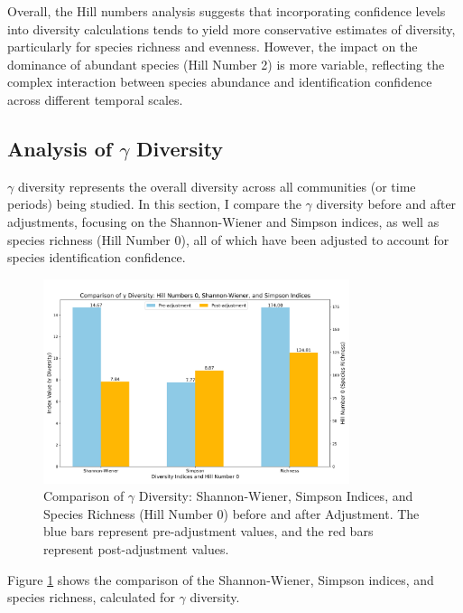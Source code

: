 \documentclass[a4paper,12pt]{article}
\begin{document}
Overall, the Hill numbers analysis suggests that incorporating confidence levels into diversity calculations tends to yield more conservative estimates of diversity, particularly for species richness and evenness. However, the impact on the dominance of abundant species (Hill Number 2) is more variable, reflecting the complex interaction between species abundance and identification confidence across different temporal scales.






\subsection{Analysis of $\gamma$ Diversity}

$\gamma$ diversity represents the overall diversity across all communities (or time periods) being studied. In this section, I compare the $\gamma$ diversity before and after adjustments, focusing on the Shannon-Wiener and Simpson indices, as well as species richness (Hill Number 0), all of which have been adjusted to account for species identification confidence.

\begin{figure}[H]
\centering
\includegraphics[width=0.8\textwidth]{Figures/gamma.png}
\caption{Comparison of $\gamma$ Diversity: Shannon-Wiener, Simpson Indices, and Species Richness (Hill Number 0) before and after Adjustment. The blue bars represent pre-adjustment values, and the red bars represent post-adjustment values.}
\label{fig:gamma_diversity}
\end{figure}

Figure \ref{fig:gamma_diversity} shows the comparison of the Shannon-Wiener, Simpson indices, and species richness, calculated for $\gamma$ diversity.
\end{document}
